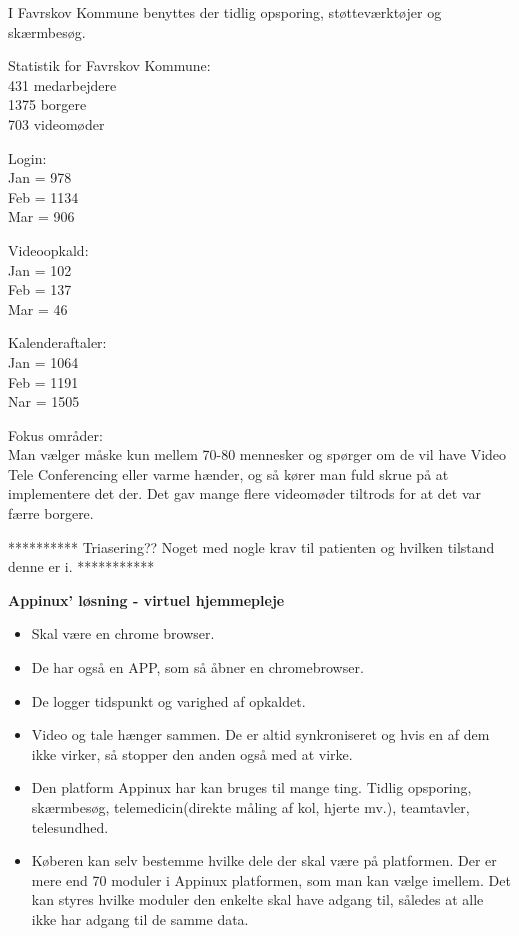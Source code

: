 I Favrskov Kommune benyttes der tidlig opsporing, støtteværktøjer og skærmbesøg.

Statistik for Favrskov Kommune: \\
431 medarbejdere \\
1375 borgere\\
703 videomøder

Login: \\
Jan = 978 \\
Feb = 1134 \\
Mar = 906

Videoopkald: \\
Jan = 102 \\
Feb = 137 \\
Mar = 46

Kalenderaftaler: \\
Jan = 1064 \\
Feb = 1191 \\
Nar = 1505

Fokus områder:\\
Man vælger måske kun mellem 70-80 mennesker og spørger om de vil have Video Tele Conferencing eller varme hænder, og så kører man fuld skrue på at implementere det der. Det gav mange flere videomøder tiltrods for at det var færre borgere.


********** Triasering?? Noget med nogle krav til patienten og hvilken tilstand denne er i. ***********


\textbf{Appinux' løsning - virtuel hjemmepleje} 
\begin{itemize}
	\item Skal være en chrome browser.
	\item De har også en APP, som så åbner en chromebrowser.
	\item De logger tidspunkt og varighed af opkaldet.
	\item Video og tale hænger sammen. De er altid synkroniseret og hvis en af dem ikke virker, så stopper den anden også med at virke.
	\item Den platform Appinux har kan bruges til mange ting. Tidlig opsporing, skærmbesøg, telemedicin(direkte måling af kol, hjerte mv.), teamtavler, telesundhed.
	\item Køberen kan selv bestemme hvilke dele der skal være på platformen. 
Der er mere end 70 moduler i Appinux platformen, som man kan vælge imellem.
Det kan styres hvilke moduler den enkelte skal have adgang til, således at alle ikke har adgang til de samme data.
\end{itemize}


